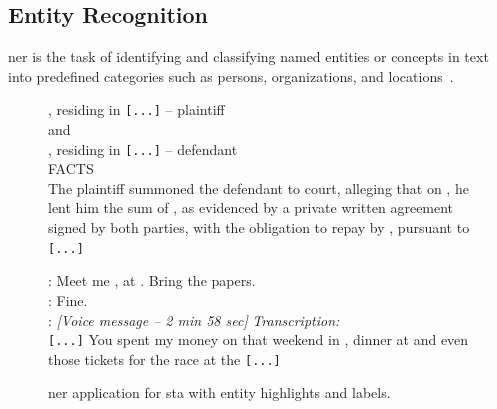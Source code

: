 \subsection{Entity Recognition}
\label{sec:rw:ner}
\begin{definition}
    \Acf{ner} is the task of identifying and classifying named entities or concepts in text into predefined categories such as persons, organizations, and locations~\cite{entityorientedsearch2018balog,keraghel2024recentadvancesnamedentity,jm3}.
\end{definition}

\begin{figure}[htbp]
\centering
\begin{minipage}[t]{0.48\linewidth}
\small
{}, residing in  \texttt{[...]} -- plaintiff\\
and\\
, residing in  \texttt{[...]} -- defendant\\
FACTS\\
The plaintiff summoned the defendant to court, alleging that on , he lent him the sum of , as evidenced by a private written agreement signed by both parties, with the obligation to repay by , pursuant to  \texttt{[...]}
\label{fig:extract-ner-judgment}
\end{minipage}
\hfill
\begin{minipage}[t]{0.48\linewidth}
\small
\DATE{[2025/04/22 -- 11:45]} : Meet me , at . Bring the papers.\\
\DATE{[2025/04/22 -- 11:46]} : Fine.\\
\DATE{[2025/04/22 -- 18:51]} : \textit{[Voice message -- 2 min 58 sec]}
\quad \textit{Transcription:}\\
\quad \texttt{[...]} You spent my money on that weekend in , dinner at  and even those tickets for the race at the  \texttt{[...]}\\
\label{fig:extract-ner-chat}
\end{minipage}
\caption{\Ac{ner} application for \acl{sta} with entity highlights and labels.}
\label{fig:extracts-ner}
\end{figure}

